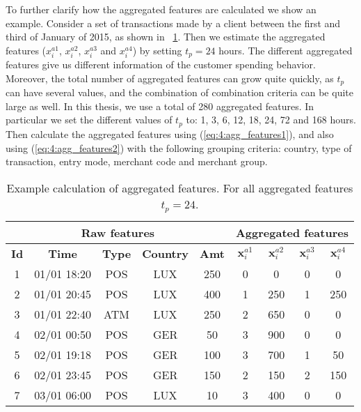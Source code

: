   To further clarify how the aggregated features are calculated we show an example. Consider a set 
  of transactions made by a client between the first and third of January of 2015, as shown in 
  \tablename{~\ref{tab:4:agg_features_example1}}. Then we estimate the aggregated features 
  ($x_i^{a1}$, $x_i^{a2}$, $x_i^{a3}$ and $x_i^{a4}$) by setting $t_p=24$ hours. The 
  different aggregated features give us different information of the customer spending   behavior. 
  Moreover, the total number of aggregated features can grow quite quickly, as $t_p$   can have   
  several values, and the combination of combination criteria can be quite large as well.
  In this thesis, we use a total of 280 aggregated features. In particular we set the 
  different values of $t_p$ to: 1, 3, 6, 12, 18, 24, 72 and 168 hours. Then calculate the 
  aggregated features   using (\ref{eq:4:agg_features1}), and also using (\ref{eq:4:agg_features2}) 
  with the following  grouping criteria:  country, type of transaction, entry mode, merchant code 
  and merchant group.
  
	\begin{table}[!t]
		\centering
    \footnotesize
   \begin{tabular}{|c c c c c | c c c c|}
   \hline
   \multicolumn{5}{|c|}{\textbf{Raw features}} & \multicolumn{4}{c|}{\textbf{Aggregated features}} 
		\\  \hline
   \textbf{Id} &\textbf{Time} & \textbf{Type} & \textbf{Country} & 
	\textbf{Amt} 		& $\mathbf{x}_i^{a1}$& $\mathbf{x}_i^{a2}$ & $\mathbf{x}_i^{a3}$ & 
$\mathbf{x}_i^{a4}$\\
   \hline
		1&  01/01 18:20& POS & LUX & 250 & 0 & 0  & 0 & 0\\
		2& 01/01 20:45& POS & LUX & 400 & 1 & 250& 1 & 250\\
		3& 01/01 22:40& ATM & LUX & 250 & 2 & 650& 0 & 0\\
		4&02/01 00:50& POS & GER & 50 		& 3 & 900& 0& 0\\
		5& 02/01 19:18& POS & GER & 100 	  & 3 & 700& 1& 50\\
		6& 02/01 23:45& POS & GER & 150 	  & 2 & 150& 2& 150\\
		7& 03/01 06:00& POS & LUX & 10  & 3 & 400& 0& 0\\
   \hline
   \end{tabular}
		\caption{Example calculation of aggregated features. For all aggregated features $t_p=24$.}
		\label{tab:4:agg_features_example1}
  \end{table}
	
